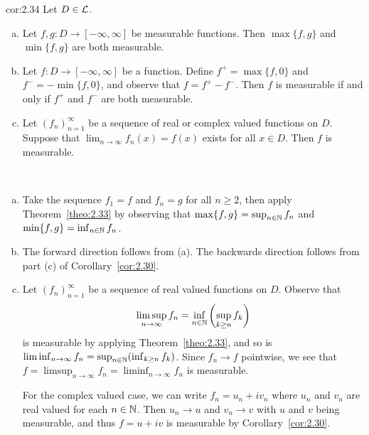 \begin{cor}{cor:2.34}
    Let $D \in {\cal L}$. 
    \begin{enumerate}[(a)]
        \item Let $f, g : D \to [-\infty, \infty]$ be measurable 
        functions. Then $\max\{f, g\}$ and $\min\{f, g\}$ are 
        both measurable. 
        \item Let $f : D \to [-\infty, \infty]$ be a function. Define 
        $f^+ = \max\{f, 0\}$ and $f^- = -\min\{f, 0\}$, and observe that 
        $f = f^+ - f^-$. Then $f$ is measurable if and only if $f^+$ and 
        $f^-$ are both measurable. 
        \item Let $(f_n)_{n=1}^\infty$ be a sequence of real or complex
        valued functions on $D$. Suppose that $\lim_{n\to\infty} 
        f_n(x) = f(x)$ exists for all $x \in D$. Then $f$ is measurable. 
    \end{enumerate}
\end{cor}
\begin{pf}~
    \begin{enumerate}[(a)]
        \item Take the sequence $f_1 = f$ and $f_n = g$ for all $n \geq 2$, 
        then apply Theorem~\ref{theo:2.33} by observing that 
        $\max\{f, g\} = \sup_{n\in\mathbb{N}} f_n$ and $\min\{f, g\} = 
        \inf_{n\in\mathbb{N}} f_n$. 
        \item The forward direction follows from (a). The backwards 
        direction follows from part (c) of Corollary~\ref{cor:2.30}. 
        \item Let $(f_n)_{n=1}^\infty$ be a sequence of real valued 
        functions on $D$. Observe that 
        \[ \limsup_{n\to\infty} f_n = \inf_{n\in\mathbb{N}} \left( \sup_{k\geq n}
        f_k \right) \] 
        is measurable by applying Theorem~\ref{theo:2.33}, and so is 
        $\liminf_{n\to\infty} f_n = \sup_{n\in\mathbb{N}} (\inf_{k\geq n} f_k)$. 
        Since $f_n \to f$ pointwise, we see that  $f = \limsup_{n\to\infty} f_n 
        = \liminf_{n\to\infty} f_n$ is measurable. 
        
        For the complex valued case, we can write $f_n = u_n + iv_n$ 
        where $u_n$ and $v_n$ are real valued for each $n \in \mathbb{N}$. 
        Then $u_n \to u$ and $v_n \to v$ with $u$ and $v$ being measurable, 
        and thus $f = u + iv$ is measurable by Corollary~\ref{cor:2.30}. \qedhere 
    \end{enumerate}
\end{pf}
